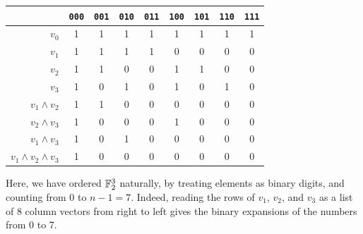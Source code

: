 \documentclass{article}
\begin{document}
\renewcommand{\arraystretch}{1.3}
\begin{table}[h!]
\small{
\begin{center}
\begin{tabular}{|r|c|c|c|c|c|c|c|c|}
\hline
& \texttt{000} & \texttt{001} & \texttt{010} & \texttt{011} & \texttt{100} & \texttt{101} & \texttt{110} & \texttt{111}  \\ \hline
$v_0$ & 1 & 1 & 1 & 1 & 1 & 1 & 1 & 1 \\ \hline
$v_1$ & 1 & 1 & 1 & 1 & 0 & 0 & 0 & 0 \\ \hline
$v_2$ & 1 & 1 & 0 & 0 & 1 & 1 & 0 & 0 \\ \hline
$v_3$ & 1 & 0 & 1 & 0 & 1 & 0 & 1 & 0 \\ \hline
$v_1 \land v_2$ & 1 & 1 & 0 & 0 & 0 & 0 & 0 & 0 \\ \hline
$v_2 \land v_3$ & 1 & 0 & 0 & 0 & 1 & 0 & 0 & 0 \\ \hline
$v_1 \land v_3$ & 1 & 0 & 1 & 0 & 0 & 0 & 0 & 0 \\ \hline
$v_1 \land v_2 \land v_3$ & 1 & 0 & 0 & 0 & 0 & 0 & 0 & 0 \\ \hline
\end{tabular}
\end{center}
}
\end{table}

\begin{note}
	Here, we have ordered $\mathbb{F}_2^3$ naturally, by treating elements as binary digits, and counting from 0 to $n-1 = 7$. Indeed, reading the rows of $v_1$, $v_2$, and $v_3$ as a list of 8 column vectors from right to left gives the binary expansions of the numbers from 0 to 7.
\end{note}
\end{document}
